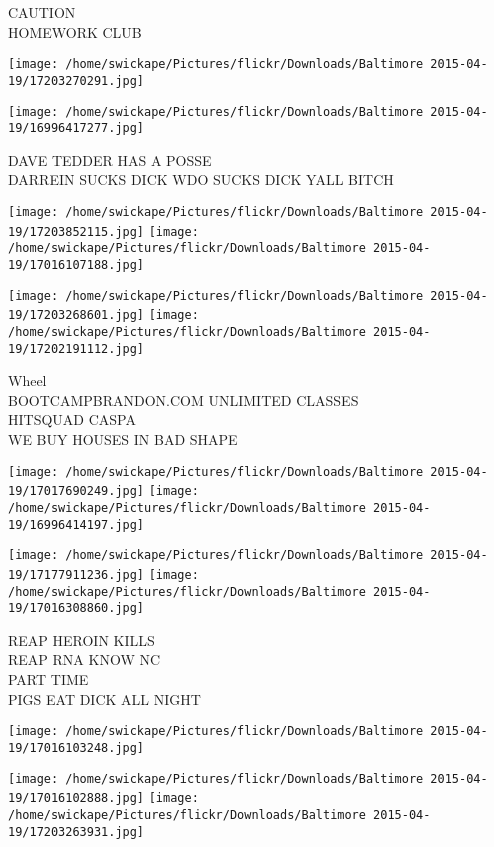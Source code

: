 \documentclass[10pt,letterpaper]{article}
\begin{document}
CAUTION\\
HOMEWORK CLUB\\
\pagebreak

\texttt{[image: /home/swickape/Pictures/flickr/Downloads/Baltimore 2015-04-19/17203270291.jpg]}

\vspace{0.25in}
\texttt{[image: /home/swickape/Pictures/flickr/Downloads/Baltimore 2015-04-19/16996417277.jpg]}

DAVE TEDDER HAS A POSSE\\
DARREIN SUCKS DICK WDO SUCKS DICK YALL BITCH\\
\pagebreak

\texttt{[image: /home/swickape/Pictures/flickr/Downloads/Baltimore 2015-04-19/17203852115.jpg]}
\texttt{[image: /home/swickape/Pictures/flickr/Downloads/Baltimore 2015-04-19/17016107188.jpg]}

\texttt{[image: /home/swickape/Pictures/flickr/Downloads/Baltimore 2015-04-19/17203268601.jpg]}
\texttt{[image: /home/swickape/Pictures/flickr/Downloads/Baltimore 2015-04-19/17202191112.jpg]}

Wheel\\
BOOTCAMPBRANDON.COM UNLIMITED CLASSES\\
HITSQUAD CASPA\\
WE BUY HOUSES IN BAD SHAPE\\
\pagebreak

\texttt{[image: /home/swickape/Pictures/flickr/Downloads/Baltimore 2015-04-19/17017690249.jpg]}
\texttt{[image: /home/swickape/Pictures/flickr/Downloads/Baltimore 2015-04-19/16996414197.jpg]}

\texttt{[image: /home/swickape/Pictures/flickr/Downloads/Baltimore 2015-04-19/17177911236.jpg]}
\texttt{[image: /home/swickape/Pictures/flickr/Downloads/Baltimore 2015-04-19/17016308860.jpg]}

REAP HEROIN KILLS\\
REAP RNA KNOW NC\\
PART TIME\\
PIGS EAT DICK ALL NIGHT\\
\pagebreak

\texttt{[image: /home/swickape/Pictures/flickr/Downloads/Baltimore 2015-04-19/17016103248.jpg]}

\vspace{0.25in}
\texttt{[image: /home/swickape/Pictures/flickr/Downloads/Baltimore 2015-04-19/17016102888.jpg]}
\texttt{[image: /home/swickape/Pictures/flickr/Downloads/Baltimore 2015-04-19/17203263931.jpg]}
\end{document}
